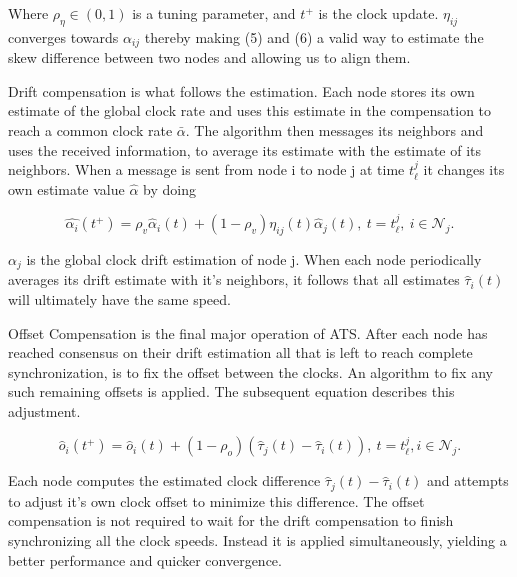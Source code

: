 \documentclass[a4paper,12pt]{article}
\begin{document}
    Where $\rho_\eta \in (0, 1)$ is a tuning parameter, and $t^+$ is the clock update. $\eta_{ij}$ converges towards $\alpha_{ij}$ thereby making (5) and (6) a valid way to estimate the skew difference between two nodes and allowing us to align them.
    
    Drift compensation is what follows the estimation. Each node stores its own estimate of the global clock rate and uses this estimate in the compensation to reach a common clock rate $\bar{\alpha}$. The algorithm then messages its neighbors and uses the received information, to average its estimate with the estimate of its neighbors. When a message is sent from node i to node j at time $t^j_\ell$ it changes its own estimate value $\hat{\alpha}$ by doing
    
    \begin{equation}
        \hat{\alpha_i}(t^+) = \rho_v\hat\alpha_i(t) + (1 - \rho_v)\eta_{ij}(t)\hat\alpha_j(t), \ t = t^j_\ell, \ i \in \mathcal{N}_j.
    \end{equation}
    
    $\alpha_j$ is the global clock drift estimation of node j. When each node periodically averages its drift estimate with it's neighbors, it follows that all estimates $\hat\tau_i(t)$ will ultimately have the same speed.
    
    
    Offset Compensation is the final major operation of ATS. After each node has reached consensus on their drift estimation all that is left to reach complete synchronization, is to fix the offset between the clocks. An algorithm to fix any such remaining offsets is applied. The subsequent equation describes this adjustment.
    
    \begin{equation}
        \hat{o}_i(t^+) = \hat{o}_i(t) + (1 - \rho_o)(\hat{\tau}_j(t) - \hat{\tau}_i(t)), \ t=t^j_\ell,i \in \mathcal{N}_j.
    \end{equation}
    
    Each node computes the estimated clock difference $\hat\tau_j(t) - \hat\tau_i(t)$ and attempts to adjust it's own clock offset to minimize this difference. The offset compensation is not required to wait for the drift compensation to finish synchronizing all the clock speeds. Instead it is applied simultaneously, yielding a better performance and quicker convergence.  
    
\end{document}

